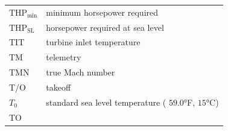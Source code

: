 \documentclass[
]{book}
\begin{document}
\begin{longtable}[]{@{}ll@{}}
\begin{minipage}[t]{0.47\columnwidth}
\({\mathrm{THP}}_{\mathrm{min}}\)\strut
\end{minipage} & \begin{minipage}[t]{0.47\columnwidth}\raggedright
minimum horsepower required\strut
\end{minipage}\tabularnewline
\begin{minipage}[t]{0.47\columnwidth}\raggedright
\({\mathrm{THP}}_{\mathrm{SL}}\)\strut
\end{minipage} & \begin{minipage}[t]{0.47\columnwidth}\raggedright
horsepower required at sea level\strut
\end{minipage}\tabularnewline
\begin{minipage}[t]{0.47\columnwidth}\raggedright
TIT\strut
\end{minipage} & \begin{minipage}[t]{0.47\columnwidth}\raggedright
turbine inlet temperature\strut
\end{minipage}\tabularnewline
\begin{minipage}[t]{0.47\columnwidth}\raggedright
TM\strut
\end{minipage} & \begin{minipage}[t]{0.47\columnwidth}\raggedright
telemetry\strut
\end{minipage}\tabularnewline
\begin{minipage}[t]{0.47\columnwidth}\raggedright
TMN\strut
\end{minipage} & \begin{minipage}[t]{0.47\columnwidth}\raggedright
true Mach number\strut
\end{minipage}\tabularnewline
\begin{minipage}[t]{0.47\columnwidth}\raggedright
T/O\strut
\end{minipage} & \begin{minipage}[t]{0.47\columnwidth}\raggedright
takeoff\strut
\end{minipage}\tabularnewline
\begin{minipage}[t]{0.47\columnwidth}\raggedright
\(T_0\)\strut
\end{minipage} & \begin{minipage}[t]{0.47\columnwidth}\raggedright
standard sea level temperature ( \(59.0°\)F, \(15°\)C)\strut
\end{minipage}\tabularnewline
\begin{minipage}[t]{0.47\columnwidth}\raggedright
TO\strut
\end{minipage} & \begin{minipage}[t]{0.47\columnwidth}\raggedright

\end{minipage}
\end{longtable}
\end{document}
